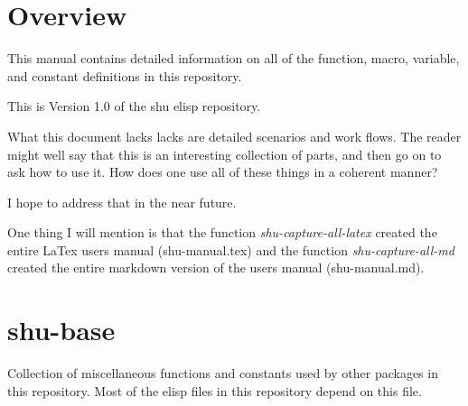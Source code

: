 




\section{Overview}


This manual contains detailed information on all of the function, macro,
variable, and constant definitions in this repository.

This is Version 1.0 of the shu elisp repository.

What this document lacks lacks are detailed scenarios and work flows.  The
reader might well say that this is an interesting collection of parts, and
then go on to ask how to use it.  How does one use all of these things in a
coherent manner?

I hope to address that in the near future.

One thing I will mention is that the function \emph{shu-capture-all-latex} created
the entire LaTex users manual (shu-manual.tex) and the function
\emph{shu-capture-all-md} created the entire markdown version of the users manual
(shu-manual.md).


\eject
\section{shu-base}


Collection of miscellaneous functions  and constants used by other
packages in this repository.  Most of the elisp files in this repository
depend on this file.


